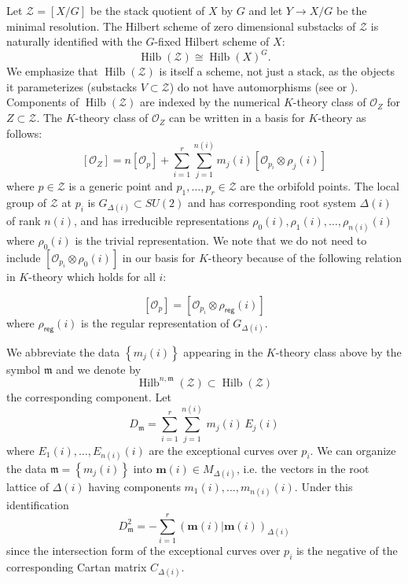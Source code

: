\documentclass{amsart}
\theoremstyle{definition}
\newcommand{\reg}{\mathsf{reg}}
\newcommand{\mdata}{\mathfrak{m}}
\renewcommand{\O}{\mathcal{O}}
\newcommand{\Zcal}{\mathcal{Z}}
\newcommand{\mvec}{\bm{m}}
\newcommand{\Hilb}{\operatorname{Hilb}}
\begin{document}
Let $\Zcal  =[X/G]$ be the stack quotient of $X$ by $G$ and let $Y\to
X/G$ be the minimal resolution. %
The Hilbert scheme of zero dimensional substacks of $\Zcal$ is
naturally identified with the $G$-fixed Hilbert scheme of $X$:
\[
\Hilb (\Zcal )\cong \Hilb (X)^{G}.
\]
We emphasize that $\Hilb (\Zcal )$ is itself a scheme, not just a
stack, as the objects it parameterizes (substacks $V\subset \Zcal $)
do not have automorphisms (see \cite{Olsson-Starr} or
\cite[\S~2.3]{Bryan-Cadman-Young}). Components of $\Hilb (\Zcal )$ are
indexed by the numerical $K$-theory class of $\O_{Z}$ for $Z\subset
\Zcal$. The $K$-theory class of $\O_{Z}$ can be written in a basis for
$K$-theory as follows:
\[
[\O_{Z}] = n[\O_{p}] + \sum_{i=1}^{r} \sum_{j=1}^{n(i)}
m_{j}(i)[\O_{p_{i}}\otimes \rho_{j}(i)] 
\]
where $p\in \Zcal$ is a generic point and $p_{1},\dotsc ,p_{r}\in \Zcal$
are the orbifold points. The local group of $\Zcal$ at $p_{i}$ is
$G_{\Delta (i)}\subset SU(2)$  and has corresponding root system
$\Delta (i)$ of rank $n(i)$, and has irreducible representations
$\rho_{0}(i),\rho_{1}(i),\dotsc ,\rho_{n(i)}(i)$ where $\rho_{0}(i)$
is the trivial representation. 
We note that we do not need to include $ [\O_{p_{i}}\otimes
\rho_{0}(i)]$ in our basis for $K$-theory because of the following
relation in  $K$-theory which holds for all $i$:

\begin{equation}\label{eqn: Op = O0timesrhoreg}
[\O_{p}] = [\O_{p_{i}}\otimes \rho_{\reg}(i)]
\end{equation}
where $\rho_{\reg}(i)$ is the regular representation of
$G_{\Delta(i)}$.


We abbreviate the data $\left\{m_{j}(i) \right\}$ appearing in the
$K$-theory class above by the symbol $\mdata$ and we denote by
\[
\Hilb^{n,\mdata}(\Zcal ) \subset \Hilb (\Zcal )
\]
the corresponding component. Let
\[
D_{\mdata} = \sum_{i=1}^{r} \sum_{j=1}^{n(i)} \, m_{j}(i)\, E_{j}(i)
\]
where
$E_{1}(i),\dotsc ,E_{n(i)}(i)$ are
the exceptional curves over $p_{i}$. We can organize the data $\mdata = \left\{m_{j}(i) \right\}$ into
$\mvec (i)\in M_{\Delta (i)}$, i.e.  the vectors in the root lattice
of $\Delta (i)$ having components $ m_{1}(i),\dotsc
,m_{n(i)}(i)$. Under this identification
\[
D_{\mdata}^{2} = -\sum_{i=1}^{r} \left(\mvec (i)|\mvec (i)
\right)_{\Delta (i)} 
\]
since the intersection form of the exceptional curves over $p_{i}$ is
the negative of the corresponding Cartan matrix $C_{\Delta (i)}$. 
\end{document}
